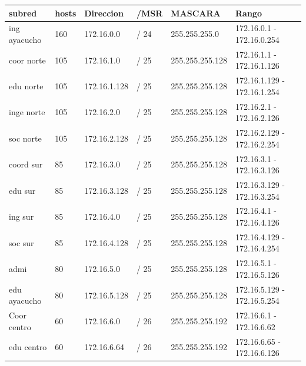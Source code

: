 \begin{table}[htbp]
\begin{tabular}{|l|l|l|l|l|l|}
\hline
\rowcolor[HTML]{34FF34} 
\textbf{subred}      & \textbf{hosts} & \textbf{Direccion} & \textbf{/MSR} & \textbf{MASCARA} & \textbf{Rango}              \\ \hline
ing ayacucho         & 160            & 172.16.0.0         & / 24          & 255.255.255.0    & 172.16.0.1 - 172.16.0.254   \\ \hline
coor norte           & 105            & 172.16.1.0         & / 25          & 255.255.255.128  & 172.16.1.1 - 172.16.1.126   \\ \hline
edu norte      & 105            & 172.16.1.128       & / 25          & 255.255.255.128  & 172.16.1.129 - 172.16.1.254 \\ \hline
inge norte           & 105            & 172.16.2.0         & / 25          & 255.255.255.128  & 172.16.2.1 - 172.16.2.126   \\ \hline
soc norte         & 105            & 172.16.2.128       & / 25          & 255.255.255.128  & 172.16.2.129 - 172.16.2.254 \\ \hline
coord sur            & 85             & 172.16.3.0         & / 25          & 255.255.255.128  & 172.16.3.1 - 172.16.3.126   \\ \hline
edu sur        & 85             & 172.16.3.128       & / 25          & 255.255.255.128  & 172.16.3.129 - 172.16.3.254 \\ \hline
ing sur              & 85             & 172.16.4.0         & / 25          & 255.255.255.128  & 172.16.4.1 - 172.16.4.126   \\ \hline
soc sur         & 85             & 172.16.4.128       & / 25          & 255.255.255.128  & 172.16.4.129 - 172.16.4.254 \\ \hline
admi                 & 80             & 172.16.5.0         & / 25          & 255.255.255.128  & 172.16.5.1 - 172.16.5.126   \\ \hline
edu ayacucho   & 80             & 172.16.5.128       & / 25          & 255.255.255.128  & 172.16.5.129 - 172.16.5.254 \\ \hline
Coor centro & 60             & 172.16.6.0         & / 26          & 255.255.255.192  & 172.16.6.1 - 172.16.6.62    \\ \hline
edu centro    & 60             & 172.16.6.64        & / 26          & 255.255.255.192  & 172.16.6.65 - 172.16.6.126  \\ \hline

\end{tabular}
\end{table}
